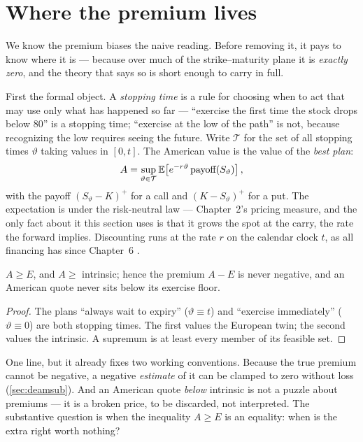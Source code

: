 \section{Where the premium lives}
\label{sec:deamwhere}

We know the premium biases the naive reading.  Before removing it, it
pays to know where it is --- because over much of the strike--maturity
plane it is \emph{exactly zero}, and the theory that says so is short
enough to carry in full.

First the formal object.  A \emph{stopping time} is a rule for
choosing when to act that may use only what has happened so far ---
``exercise the first time the stock drops below $80$'' is a stopping
time; ``exercise at the low of the path'' is not, because recognizing
the low requires seeing the future.  Write $\mathcal{T}$ for the set
of all stopping times $\vartheta$ taking values in $[0,t]$.  The
American value is the value of the \emph{best plan}:
\begin{equation}
A=\sup_{\vartheta\in\mathcal{T}}
\mathbb{E}\!\left[e^{-r\vartheta}\,
\text{payoff}(S_\vartheta)\right],
\label{eq:deamstop}
\end{equation}
with the payoff $(S_\vartheta-K)^+$ for a call and $(K-S_\vartheta)^+$
for a put.  The expectation is under the risk-neutral law ---
Chapter~2's pricing measure, and the only fact about it this section
uses is that it grows the spot at the carry, the rate the forward
implies.  Discounting runs at the rate $r$ on the calendar clock $t$,
as all financing has since Chapter~6 \citep{PeskirShiryaev2006}.

\begin{proposition}
\label{prop:deamdom}
$A\ge E$, and $A\ge$ intrinsic; hence the premium $A-E$ is never
negative, and an American quote never sits below its exercise floor.
\end{proposition}

\begin{proof}
The plans ``always wait to expiry'' ($\vartheta\equiv t$) and
``exercise immediately'' ($\vartheta\equiv0$) are both stopping times.
The first values the European twin; the second values the intrinsic.
A supremum is at least every member of its feasible set.
\end{proof}

One line, but it already fixes two working conventions.  Because the
true premium cannot be negative, a negative \emph{estimate} of it can
be clamped to zero without loss (\cref{sec:deamsub}).  And
an American quote \emph{below} intrinsic is not a puzzle about
premiums --- it is a broken price, to be discarded, not interpreted.
The substantive question is when the inequality $A\ge E$ is an
equality: when is the extra right worth nothing?

